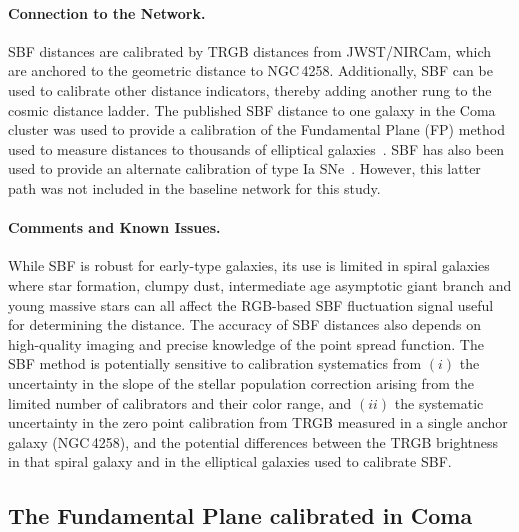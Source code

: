 \paragraph{Connection to the Network.}
SBF distances are calibrated by TRGB distances from JWST/NIRCam, which are anchored to the geometric distance to NGC\,4258. 
Additionally, SBF can be used to calibrate other distance indicators, thereby adding another rung to the cosmic distance ladder. The published SBF distance to one galaxy in the Coma cluster \citep{2021ApJS..255...21J} was used to provide a calibration of the Fundamental Plane (FP) method used to measure distances to thousands of elliptical galaxies~\citep{2025MNRAS.539.3627S}. SBF has also been used to provide an alternate calibration of type Ia SNe~\citep{2023ApJ...953...35G}. However, this latter path was not included in the baseline network for this study.

\paragraph{Comments and Known Issues.}
While SBF is robust for early-type galaxies, its use is limited in spiral galaxies where star formation, clumpy dust, intermediate age asymptotic giant branch and young massive stars can all affect the RGB-based SBF fluctuation signal useful for determining the distance. The accuracy of SBF distances also depends on high-quality imaging and precise knowledge of the point spread function. The SBF method is potentially sensitive to calibration systematics from $(i)$ the uncertainty in the slope of the stellar population correction arising from the limited number of calibrators and their color range, and $(ii)$ the systematic uncertainty in the zero point calibration from TRGB measured in a single anchor galaxy (NGC\,4258), and the potential differences between the TRGB brightness in that spiral galaxy and in the elliptical galaxies used to calibrate SBF.

\subsection{The Fundamental Plane calibrated in Coma\label{app:data:coma}}
